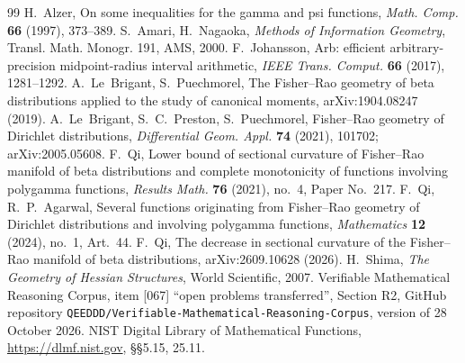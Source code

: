 \documentclass[11pt,a4paper]{article}
\theoremstyle{definition}
\theoremstyle{remark}
\begin{document}
\begin{thebibliography}{99}
 H.~Alzer, On some inequalities for the gamma and psi functions, \emph{Math. Comp.} \textbf{66} (1997), 373--389.
 S.~Amari, H.~Nagaoka, \emph{Methods of Information Geometry}, Transl. Math. Monogr. 191, AMS, 2000.
 F.~Johansson, Arb: efficient arbitrary-precision midpoint-radius interval arithmetic, \emph{IEEE Trans. Comput.} \textbf{66} (2017), 1281--1292.
 A.~Le~Brigant, S.~Puechmorel, The Fisher--Rao geometry of beta distributions applied to the study of canonical moments, arXiv:1904.08247 (2019).
 A.~Le~Brigant, S.~C.~Preston, S.~Puechmorel, Fisher--Rao geometry of Dirichlet distributions, \emph{Differential Geom. Appl.} \textbf{74} (2021), 101702; arXiv:2005.05608.
 F.~Qi, Lower bound of sectional curvature of Fisher--Rao manifold of beta distributions and complete monotonicity of functions involving polygamma functions, \emph{Results Math.} \textbf{76} (2021), no.~4, Paper No.~217.
 F.~Qi, R.~P.~Agarwal, Several functions originating from Fisher--Rao geometry of Dirichlet distributions and involving polygamma functions, \emph{Mathematics} \textbf{12} (2024), no.~1, Art.~44.
 F.~Qi, The decrease in sectional curvature of the Fisher--Rao manifold of beta distributions, arXiv:2609.10628 (2026).
 H.~Shima, \emph{The Geometry of Hessian Structures}, World Scientific, 2007.
 Verifiable Mathematical Reasoning Corpus, item [067] ``open problems transferred'', Section R2, GitHub repository \texttt{QEEDDD/Verifiable-Mathematical-Reasoning-Corpus}, version of 28 October 2026.
 NIST Digital Library of Mathematical Functions, \url{https://dlmf.nist.gov}, §§5.15, 25.11.
\end{thebibliography}
\end{document}
